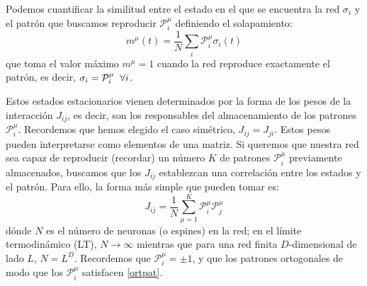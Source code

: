 \documentclass[titlepage,12pt]{article}
\numberwithin{equation}{section}
\begin{document}
	Podemos cuantificar la similitud entre el estado en el que se encuentra la red $\sigma_i$ y el patrón que buscamos reproducir $\mathcal{P}^\mu_i$ definiendo el solapamiento:
	\begin{equation}
	m^\mu(t)=\frac{1}{N}\sum_i \mathcal{P}^\mu_i\sigma_i(t)
	\label{overlap}
	\end{equation}
	que toma el valor máximo $m^\mu = 1$ cuando la red reproduce exactamente el patrón, es decir, $\sigma_i = \mathcal{P}^\mu_i\hspace{0.2cm}\forall i$.
	
	Estos estados estacionarios vienen determinados por la forma de los pesos de la interacción $J_{ij}$, es decir, son los responsables del almacenamiento de los patrones $\mathcal{P}^\mu_i$. Recordemos que hemos elegido el caso simétrico, $J_{ij}=J_{ji}$. Estos pesos pueden interpretarse como elementos de una matriz. Si queremos que nuestra red sea capaz de reproducir (recordar) un número $K$ de patrones $\mathcal{P}^\mu_i$ previamente almacenados, buscamos que los $J_{ij}$ establezcan una correlación entre los estados y el patrón. Para ello, la forma más simple que pueden tomar es:
	\begin{equation} \label{J-eq}
	J_{ij}=\frac{1}{N}\sum_{\mu=1}^K \mathcal{P}^\mu_i \mathcal{P}^\mu_j
	\label{Jint}
	\end{equation}
	dónde $N$ es el número de neuronas (o espines) en la red; en el límite termodinámico (LT), $N\rightarrow\infty$ mientras que para una red finita $D$-dimensional de lado $L$, $N=L^D$. Recordemos que $\mathcal{P}^\mu_i = \pm1$, y que los patrones ortogonales de modo que los $\mathcal{P}^\mu_i$ satisfacen \eqref{ortpat}.
\end{document}
